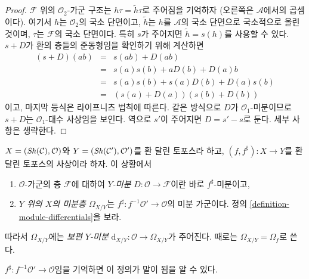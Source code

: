 \begin{proof}
$\mathcal{F}$ 위의 $\mathcal{O}_2$-가군 구조는
$h \tau = \tilde h \tau$로 주어짐을 기억하자
(오른쪽은 $\mathcal{A}$에서의 곱셈이다). 여기서 $h$는
$\mathcal{O}_2$의 국소 단면이고, $\tilde h$는 $h$를 $\mathcal{A}$의
국소 단면으로 국소적으로 올린 것이며, $\tau$는 $\mathcal{F}$의
국소 단면이다. 특히 $s$가 주어지면 $\tilde h = s(h)$를 사용할 수 있다.
$s + D$가 환의 층들의 준동형임을 확인하기 위해 계산하면
\begin{eqnarray*}
(s + D)(ab) & = & s(ab) + D(ab) \\
& = & s(a)s(b) + aD(b) + D(a)b \\
& = & s(a) s(b) + s(a)D(b) + D(a)s(b) \\
& = & (s(a) + D(a))(s(b) + D(b))
\end{eqnarray*}
이고, 마지막 등식은 라이프니츠 법칙에 따른다. 같은 방식으로
$D$가 $\mathcal{O}_1$-미분이므로 $s + D$는 $\mathcal{O}_1$-대수
사상임을 보인다. 역으로 $s'$이 주어지면 $D = s' - s$로 둔다.
세부 사항은 생략한다.
\end{proof}

\begin{definition}
\label{definition-sheaf-differentials}
$X = (\mathop{\mathit{Sh}}\nolimits(\mathcal{C}), \mathcal{O})$와
$Y = (\mathop{\mathit{Sh}}\nolimits(\mathcal{C}'), \mathcal{O}')$를 환 달린 토포스라 하고,
$(f, f^\sharp) : X \to Y$를 환 달린 토포스의 사상이라 하자.
이 상황에서
\begin{enumerate}
\item $\mathcal{O}$-가군의 층 $\mathcal{F}$에 대하여
{\it $Y$-미분} $D : \mathcal{O} \to \mathcal{F}$이란 바로
$f^\sharp$-미분이고,
\item {\it $Y$ 위의 $X$의 미분층 $\Omega_{X/Y}$}는
$f^\sharp : f^{-1}\mathcal{O}' \to \mathcal{O}$의 미분 가군이다.
정의 \ref{definition-module-differentials}을 보라.
\end{enumerate}
따라서 $\Omega_{X/Y}$에는 {\it 보편 $Y$-미분}
$\text{d}_{X/Y} : \mathcal{O} \longrightarrow \Omega_{X/Y}$가 주어진다.
때로는 $\Omega_{X/Y} = \Omega_f$로 쓴다.
\end{definition}

\noindent
$f^\sharp : f^{-1}\mathcal{O}' \to \mathcal{O}$임을 기억하면 이 정의가
말이 됨을 알 수 있다.

